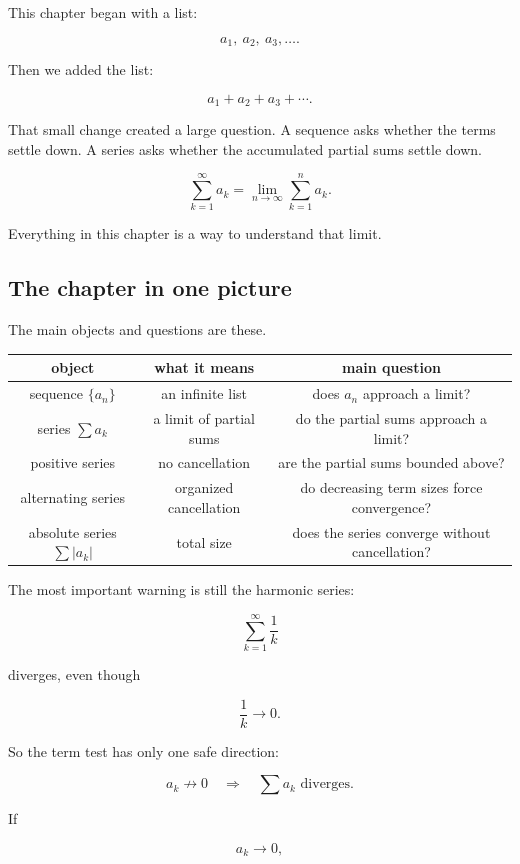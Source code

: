 This chapter began with a list:

\[
a_1,\ a_2,\ a_3,\ldots.
\]

Then we added the list:

\[
a_1+a_2+a_3+\cdots.
\]

That small change created a large question.  A sequence asks whether the terms settle
down.  A series asks whether the accumulated partial sums settle down.

\[
\boxed{
\sum_{k=1}^{\infty}a_k
=
\lim_{n\to\infty}
\sum_{k=1}^{n}a_k.
}
\]

Everything in this chapter is a way to understand that limit.

\subsection{The chapter in one picture}
\label{subsec:chapter-in-one-picture}

The main objects and questions are these.

\begin{center}
\begin{tabular}{c|c|c}
\textbf{object} & \textbf{what it means} & \textbf{main question} \\ \hline
sequence \(\{a_n\}\) & an infinite list & does \(a_n\) approach a limit? \\[3pt]
series \(\sum a_k\) & a limit of partial sums & do the partial sums approach a limit? \\[3pt]
positive series & no cancellation & are the partial sums bounded above? \\[3pt]
alternating series & organized cancellation & do decreasing term sizes force convergence? \\[3pt]
absolute series \(\sum |a_k|\) & total size & does the series converge without cancellation?
\end{tabular}
\end{center}

The most important warning is still the harmonic series:

\[
\sum_{k=1}^{\infty}\frac1k
\]

diverges, even though

\[
\frac1k\to0.
\]

So the term test has only one safe direction:

\[
\boxed{
a_k\not\to0
\quad\Longrightarrow\quad
\sum a_k \text{ diverges.}
}
\]

If

\[
a_k\to0,
\]


